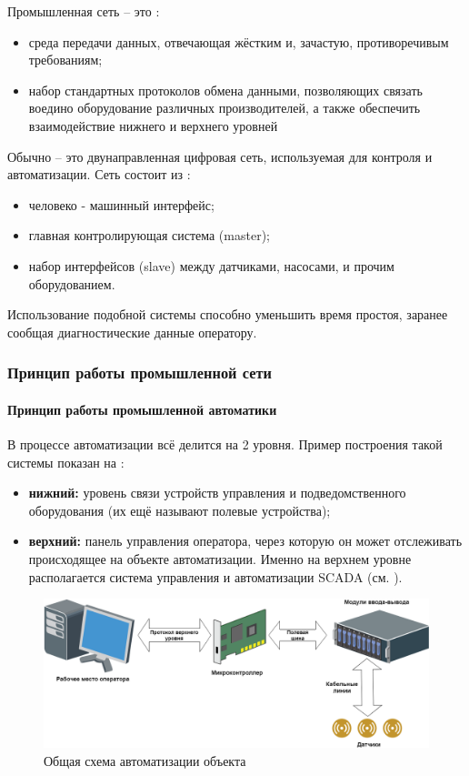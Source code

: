 Промышленная сеть -- это \cite{__2001}:
\begin{itemize}
	\item среда передачи данных, отвечающая жёстким и, зачастую, противоречивым требованиям;
	\item набор стандартных протоколов обмена данными, позволяющих связать воедино оборудование различных производителей, а также обеспечить взаимодействие нижнего и верхнего уровней
\end{itemize}

Обычно \fb -- это двунаправленная цифровая сеть, используемая для контроля и автоматизации. Сеть состоит из \cite{van_gorp_advanced_2009}:
\begin{itemize}
	\item человеко - машинный интерфейс;
	\item главная контролирующая система (master);
	\item набор интерфейсов (slave) между датчиками, насосами, и прочим оборудованием. 
\end{itemize}

Использование подобной системы способно уменьшить время простоя, заранее сообщая диагностические данные оператору. 
\subsubsection{Принцип работы промышленной сети}
\paragraph{Принцип работы промышленной автоматики}
В процессе автоматизации всё делится на 2 уровня. Пример построения такой системы показан на  \cite{promwad__2019}:
\begin{itemize}
	\item \textbf{нижний:} уровень связи устройств управления и подведомственного оборудования (их ещё называют полевые устройства);
	\item \textbf{верхний:} панель управления оператора, через которую он может отслеживать происходящее на объекте автоматизации. Именно на верхнем уровне располагается система управления и автоматизации SCADA \newline (см. ). 
\end{itemize}
\begin{figure}[H]
	\centering
	\includegraphics[width=0.9\linewidth]{images/topology}
	\caption{Общая схема автоматизации объекта}
	\label{fig:topology}
\end{figure}
